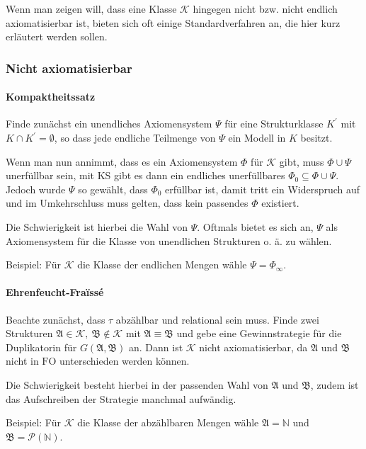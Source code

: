 \documentclass{panikzettel}
\newcommand{\A}{\mathfrak{A}}
\newcommand{\B}{\mathfrak{B}}
\newcommand{\FO}{\mathrm{FO}}
\newcommand{\K}{\mathcal{K}}
\begin{document}
Wenn man zeigen will, dass eine Klasse $\K$ hingegen nicht bzw. nicht endlich axiomatisierbar ist, bieten sich oft einige Standardverfahren an, die hier kurz erläutert werden sollen.

\subsubsection{Nicht axiomatisierbar}
	\paragraph{Kompaktheitssatz} Finde zunächst ein unendliches Axiomensystem $\Psi$ für eine Strukturklasse $K^\prime$ mit $K\cap K^\prime = \emptyset$, so dass jede endliche Teilmenge von $\Psi$ ein Modell in $K$ besitzt.
	
	Wenn man nun annimmt, dass es ein Axiomensystem $\Phi$ für $\K$ gibt, muss $\Phi \cup \Psi$ unerfüllbar sein, mit KS gibt es dann ein endliches unerfüllbares $\Phi_0 \subseteq \Phi \cup \Psi$.
	Jedoch wurde $\Psi$ so gewählt, dass $\Phi_0$ erfüllbar ist, damit tritt ein Widerspruch auf und im Umkehrschluss muss gelten, dass kein passendes $\Phi$ existiert.
	
	Die Schwierigkeit ist hierbei die Wahl von $\Psi$. Oftmals bietet es sich an, $\Psi$ als Axiomensystem für die Klasse von unendlichen Strukturen o. ä. zu wählen.
	
	Beispiel: Für $\K$ die Klasse der endlichen Mengen wähle $\Psi = \Phi_\infty$.
	
	\paragraph{Ehrenfeucht-Fra\"issé} Beachte zunächst, dass $\tau$ abzählbar und relational sein muss. Finde zwei Strukturen $\A \in \K,\ \B \notin \K$ mit $\A \equiv \B$ und gebe eine Gewinnstrategie für die Duplikatorin für $G(\A,\B)$ an. Dann ist $\K$ nicht axiomatisierbar, da $\A$ und $\B$ nicht in $\FO$ unterschieden werden können.
	
	Die Schwierigkeit besteht hierbei in der passenden Wahl von $\A$ und $\B$, zudem ist das Aufschreiben der Strategie manchmal aufwändig.
	
	Beispiel: Für $\K$ die Klasse der abzählbaren Mengen wähle $\A = \mathbb{N}$ und $\B=\mathcal{P}(\mathbb{N})$.
	
\end{document}
